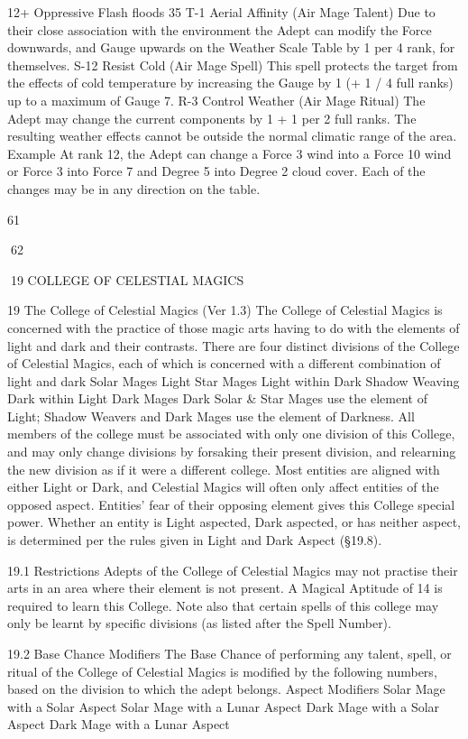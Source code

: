 \documentclass[a4paper]{article}
\begin{document}
\begin{multicols}{3}
12+
Oppressive
Flash floods
35
T-1 Aerial Affinity (Air Mage Talent) Due to their close association with the environment the Adept can modify the Force downwards, and Gauge upwards on
the Weather Scale Table by 1 per 4 rank, for themselves.
S-12 Resist Cold (Air Mage Spell) This spell protects the target from the effects of cold temperature by increasing the Gauge by 1 (+ 1 / 4 full ranks) up to a
maximum of Gauge 7.
R-3 Control Weather (Air Mage Ritual) The Adept may change the current components by 1 + 1 per 2 full ranks. The resulting weather effects cannot be outside
the normal climatic range of the area.
Example
At rank 12, the Adept can change a Force 3 wind into a Force 10 wind or Force 3 into Force 7 and Degree 5 into Degree 2 cloud cover. Each of the changes may be in any
direction on the table.

61

62

19 COLLEGE OF CELESTIAL MAGICS

19 The College of Celestial Magics (Ver 1.3)
The College of Celestial Magics is concerned with
the practice of those magic arts having to do with
the elements of light and dark and their contrasts.
There are four distinct divisions of the College of
Celestial Magics, each of which is concerned with
a different combination of light and dark
Solar Mages
Light
Star Mages
Light within Dark
Shadow Weaving Dark within Light
Dark Mages
Dark
Solar & Star Mages use the element of Light;
Shadow Weavers and Dark Mages use the element
of Darkness.
All members of the college must be associated with
only one division of this College, and may only
change divisions by forsaking their present division, and relearning the new division as if it were a
different college.
Most entities are aligned with either Light or Dark,
and Celestial Magics will often only affect entities
of the opposed aspect. Entities’ fear of their opposing element gives this College special power.
Whether an entity is Light aspected, Dark aspected,
or has neither aspect, is determined per the rules
given in Light and Dark Aspect (§19.8).

19.1 Restrictions
Adepts of the College of Celestial Magics may not
practise their arts in an area where their element is
not present.
A Magical Aptitude of 14 is required to learn this
College. Note also that certain spells of this college
may only be learnt by specific divisions (as listed
after the Spell Number).

19.2 Base Chance Modifiers
The Base Chance of performing any talent, spell,
or ritual of the College of Celestial Magics is
modified by the following numbers, based on the
division to which the adept belongs.
Aspect Modifiers
Solar Mage with a Solar Aspect
Solar Mage with a Lunar Aspect
Dark Mage with a Solar Aspect
Dark Mage with a Lunar Aspect


\end{multicols}
\end{document}
